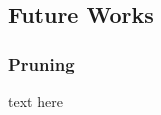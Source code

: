 \subsection{Future Works}\label{subsec:futureWorks}


\subsubsection{Pruning}\label{futureWorks:pruning}
text here
\cite{Daws1996}
